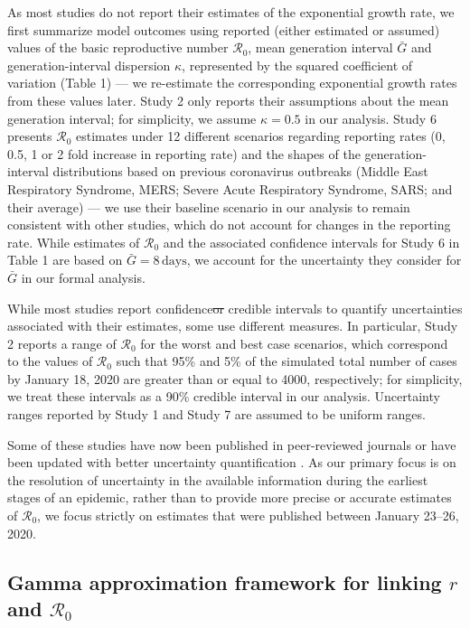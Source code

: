 \documentclass[12pt]{article}
\newcommand{\Ro}{\ensuremath{{\mathcal R}_{0}}\xspace}
\providecommand{\DIFaddtex}[1]{{\protect\color{blue}\uwave{#1}}} %
\providecommand{\DIFdeltex}[1]{{\protect\color{red}\sout{#1}}}                      %
\providecommand{\DIFaddbegin}{} %
\providecommand{\DIFaddend}{} %
\providecommand{\DIFdelbegin}{} %
\providecommand{\DIFdelend}{} %
\providecommand{\DIFadd}[1]{\texorpdfstring{\DIFaddtex{#1}}{#1}} %
\providecommand{\DIFdel}[1]{\texorpdfstring{\DIFdeltex{#1}}{}} %
\newcommand{\DIFscaledelfig}{0.5}
\newlength{\DIFdelgraphicswidth} %
\newlength{\DIFdelgraphicsheight} %
\newcommand{\DIFaddincludegraphics}[2][]{{\color{blue}\fbox{\DIFOincludegraphics[#1]{#2}}}} %
\newcommand{\DIFdelincludegraphics}[2][]{%
\sbox{\DIFdelgraphicsbox}{\DIFOincludegraphics[#1]{#2}}%
\settoboxwidth{\DIFdelgraphicswidth}{\DIFdelgraphicsbox} %
\settoboxtotalheight{\DIFdelgraphicsheight}{\DIFdelgraphicsbox} %
\scalebox{\DIFscaledelfig}{%
\parbox[b]{\DIFdelgraphicswidth}{\usebox{\DIFdelgraphicsbox}\\[-\baselineskip] \rule{\DIFdelgraphicswidth}{0em}}\llap{\resizebox{\DIFdelgraphicswidth}{\DIFdelgraphicsheight}{%
\setlength{\unitlength}{\DIFdelgraphicswidth}%
\begin{picture}(1,1)%
\thicklines\linethickness{2pt} %
{\color[rgb]{1,0,0}\put(0,0){\framebox(1,1){}}}%
{\color[rgb]{1,0,0}\put(0,0){\line( 1,1){1}}}%
{\color[rgb]{1,0,0}\put(0,1){\line(1,-1){1}}}%
\end{picture}%
}\hspace*{3pt}}} %
} %
\DeclareRobustCommand{\DIFaddbegin}{\DIFOaddbegin \let\includegraphics\DIFaddincludegraphics} %
\DeclareRobustCommand{\DIFaddend}{\DIFOaddend \let\includegraphics\DIFOincludegraphics} %
\DeclareRobustCommand{\DIFdelbegin}{\DIFOdelbegin \let\includegraphics\DIFdelincludegraphics} %
\DeclareRobustCommand{\DIFdelend}{\DIFOaddend \let\includegraphics\DIFOincludegraphics} %
\begin{document}
As most studies do not report their estimates of the exponential growth rate, we first summarize model outcomes using reported (either estimated or assumed) values of the basic reproductive number \Ro, mean generation interval $\bar G$ and generation-interval dispersion $\kappa$, represented by the squared coefficient of variation (Table 1) ---
we re-estimate the corresponding exponential growth rates from these values later.
Study 2 only reports their assumptions about the mean generation interval; for simplicity, we assume $\kappa = 0.5$ in our analysis.
Study 6 presents \Ro estimates under 12 different scenarios regarding reporting rates (0, 0.5, 1 or 2 fold increase in reporting rate) and the shapes of the generation-interval distributions based on previous coronavirus outbreaks (Middle East Respiratory Syndrome, MERS; Severe Acute Respiratory Syndrome, SARS; and their average) ---
we use their baseline scenario in our analysis to remain consistent with other studies, which do not account for changes in the reporting rate.
While estimates of \Ro and the associated confidence intervals for Study 6 in Table 1 are based on $\bar G = 8\,\mathrm{days}$, we account for the uncertainty they consider for $\bar G$ in our formal analysis.

While most studies report confidence\DIFdelbegin \DIFdel{or }\DIFdelend \DIFaddbegin \DIFadd{/}\DIFaddend credible intervals to quantify uncertainties associated with their estimates, some use different measures.
In particular, Study 2 reports a range of \Ro for the worst and best case scenarios, which correspond to the values of \Ro such that 95\% and 5\% of the simulated total number of cases by January 18, 2020 are greater than or equal to 4000, respectively;
for simplicity, we treat these intervals as a 90\% \DIFaddbegin \DIFadd{confidence/}\DIFaddend credible interval in our analysis.
Uncertainty ranges reported by Study 1 and Study 7 are assumed to be uniform ranges.

Some of these studies have now been published in peer-reviewed journals \citep{riou2020pattern, zhao2020preliminary} or have been updated with better uncertainty quantification \citep{readncov2}.
As our primary focus is on the resolution of uncertainty in the available information during the earliest stages of an epidemic, rather than to provide more precise or accurate estimates of \Ro, we focus strictly on estimates that were published between January 23--26, 2020.

\subsection{Gamma approximation framework for linking $r$ and $\Ro$}
\end{document}
